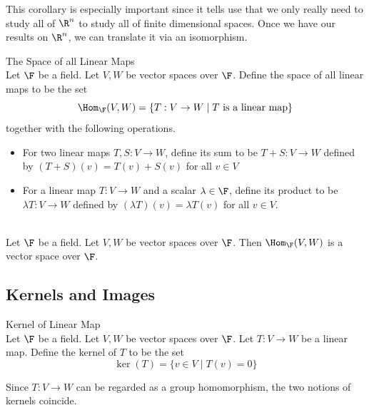 \documentclass[a4paper]{article}
\begin{document}
This corollary is especially important since it tells use that we only really need to study all of $\R^n$ to study all of finite dimensional spaces. Once we have our results on $\R^n$, we can translate it via an isomorphism. 

\begin{defn}{The Space of all Linear Maps}{}\\
Let $\F$ be a field. Let $V,W$ be vector spaces over $\F$. Define the space of all linear maps to be the set $$\Hom_\F(V,W)=\{T:V\to W\;|\;T\text{ is a linear map}\}$$ together with the following operations. 
\begin{itemize}
\item For two linear maps $T,S:V\to W$, define its sum to be $T+S:V\to W$ defined by $(T+S)(v)=T(v)+S(v)$ for all $v\in V$
\item For a linear map $T:V\to W$ and a scalar $\lambda\in\F$, define its product to be $\lambda T:V\to W$ defined by $(\lambda T)(v)=\lambda T(v)$ for all $v\in V$. 
\end{itemize}
\end{defn}

\begin{lmm}{}{}\\
Let $\F$ be a field. Let $V,W$ be vector spaces over $\F$. Then $\Hom_\F(V,W)$ is a vector space over $\F$. 
\end{lmm}

\subsection{Kernels and Images}
\begin{defn}{Kernel of Linear Map}{}\\
Let $\F$ be a field. Let $V,W$ be vector spaces over $\F$. Let $T:V\to W$ be a linear map. Define the kernel of $T$ to be the set $$\ker(T)=\{v\in V\;|\;T(v)=0\}$$
\end{defn}

Since $T:V\to W$ can be regarded as a group homomorphism, the two notions of kernels coincide. 
\end{document}
